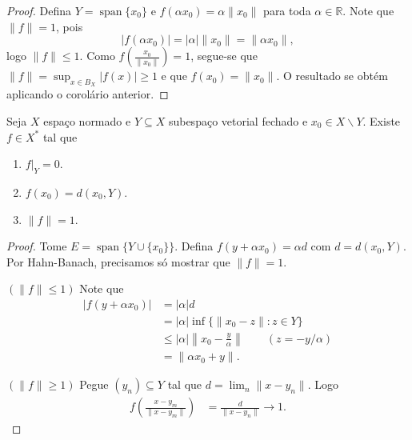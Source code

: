 \documentclass[portuguese]{article}
\theoremstyle{definition}
\newcommand{\R}{\mathbb{R}}
\begin{document}
	\begin{proof}
		Defina $Y=\operatorname{span}\{x_0\}$ e $f(\alpha x_0)=\alpha\| x_0\|$ para toda $\alpha\in\R$. Note que $\| f\|=1$, pois
		\[|f(\alpha x_0)|=|\alpha|\| x_0\|=\| \alpha x_0\|,\]
		logo $\| f\|\leq1$. Como $f\left(\frac{x_0}{\| x_0\|}\right)=1$, segue-se que $\| f\|=\sup_{x\in B_X}|f(x)|\geq1$ e que $f(x_0)=\| x_0\|$. O resultado se obtém aplicando o corolário anterior.
	\end{proof}
	\begin{coro}
		Seja $X$ espaço normado e $Y\subseteq X$ subespaço vetorial fechado e $x_0\in X\backslash Y$. Existe $f\in X^*$ tal que
		\begin{enumerate}
			\item $f|_Y=0$.
			\item $f(x_0)=d(x_0,Y)$.
			\item $\| f\|=1$.
		\end{enumerate}
	\end{coro}
	\begin{proof}
		Tome $E=\operatorname{span}\{Y\cup\{x_0\}\}$. Defina $f(y+\alpha x_0)=\alpha d$ com $d=d(x_0,Y)$. Por Hahn-Banach, precisamos só mostrar que $\| f\|=1$.
		
		$(\| f\|\leq 1)$ Note que
		\begin{align*}
			|f(y+\alpha x_0)|&=|\alpha|d\\
			&=|\alpha|\inf\{\| x_0-z\|:z\in Y\}\\
			&\leq|\alpha|\left\| x_0-\frac{y}{\alpha}\right\|\qquad(z=-y/\alpha)\\
			&=\|\alpha x_0+y\|.
		\end{align*}
		
		$(\| f\|\geq1)$ Pegue $(y_n)\subseteq Y$ tal que $d=\lim_n\| x-y_n\|$. Logo
		\begin{align*}
			f\left(\frac{x-y_m}{\| x-y_m\|}\right)&=\frac{d}{\| x-y_n\|}\to1.
		\end{align*}
	\end{proof}
	
\end{document}

